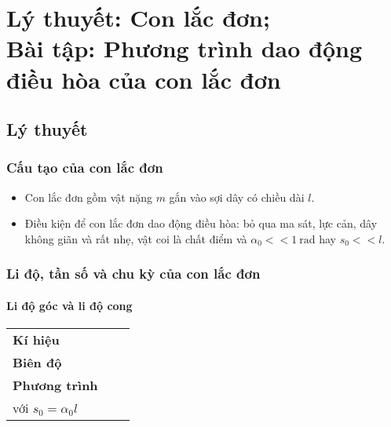 
\chapter[Lý thuyết: Con lắc đơn;\\
Bài tập: Phương trình dao động điều hòa của con lắc đơn]{Lý thuyết: Con lắc đơn;\\	Bài tập: Phương trình dao động điều hòa của con lắc đơn}
\section{Lý thuyết}
\subsection{Cấu tạo của con lắc đơn}
\begin{itemize}
	\item Con lắc đơn gồm vật nặng $m$ gắn vào sợi dây có chiều dài $l$.
	\item Điều kiện để con lắc đơn dao động điều hòa: bỏ qua ma sát, lực cản, dây không giãn và rất nhẹ, vật coi là chất điểm và $\alpha_0 <<1\ \text{rad}$ hay $s_0 << l$.
\end{itemize}
\subsection{Li độ, tần số và chu kỳ của con lắc đơn}

\subsubsection{Li độ góc và li độ cong}
\begin{tabular}{|m{7em}|m{14em}|m{14em}|}
	\hline
	\thead{} & \thead{Li độ góc} & \thead{Li độ cong} \\
	\hline
	\textbf{Kí hiệu} & \nfhead{$\alpha$} & \nfhead{$s$} \\
	\hline
	\textbf{Biên độ} & \nfhead{$\alpha _0$} & \nfhead{$s_0$} \\
	\hline
	\textbf{Phương trình} &  \nfhead{$\alpha = \alpha_0 \cos (\omega t + \varphi)$}  & \nfhead{$s=s_0 \cos (\omega t + \varphi)$\\ với $s_0 = \alpha _0 l$}\\
	\hline
\end{tabular}
